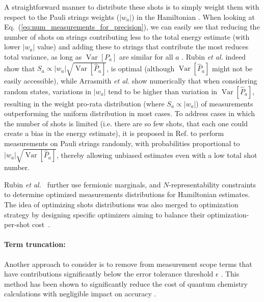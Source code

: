 A straightforward manner to distribute these shots is to simply weight them with respect to the Pauli strings weights ($|w_a|$) in the Hamiltonian \cite{Wecker2015}. When looking at Eq.~(\ref{eq:num_measurements_for_precision}), we can easily see that reducing the number of shots on strings contributing less to the total energy estimate (with lower $|w_a|$ value) and adding these to strings that contribute the most reduces total variance, as long as $\operatorname{Var}[P_a]$ are similar for all $a$ \cite{Rubin2018}. Rubin \textit{et al.} \cite{Rubin2018} indeed show that $S_a \propto |w_a|\sqrt{\operatorname{Var}[\hat{P}_a]}$, is optimal (although $\operatorname{Var}[\hat{P}_a]$ might not be easily accessible), while Arrasmith {\it et al.}  \cite{Arrasmith2020} show numerically that when considering random states, variations in $|w_a|$ tend to be higher than variation in $\operatorname{Var}[\hat{P}_a]$, resulting in the weight pro-rata distribution (where $S_a \propto |w_a|$) of measurements outperforming the uniform distribution in most cases. 
To address cases in which the number of shots is limited (i.e. there are so few shots, that each one could create a bias in the energy estimate), it is proposed in Ref. \cite{Arrasmith2020} to perform measurements on Pauli strings randomly, with probabilities proportional to $|w_a|\sqrt{\operatorname{Var}[\hat{P}_a]}$, thereby allowing unbiased estimates even with a low total shot number. 

Rubin {\it et al.}~\cite{Rubin2018} further use fermionic marginals, and $N$-representability constraints to determine optimized measurements distributions for Hamiltonian estimates. The idea of optimizing shots distributions was also merged to optimization strategy by designing specific optimizers aiming to balance their optimization-per-shot cost~\cite{Arrasmith2020,Kubler2020adaptiveoptimizer}. 

\paragraph{Term truncation:} Another approach to consider is to remove from measurement scope terms that have contributions significantly below the error tolerance threshold $\epsilon$ \cite{mccleanTheoryVariationalHybrid2015}. This method has been shown to significantly reduce the cost of quantum chemistry calculations with negligible impact on accuracy \cite{McClean2014}.

